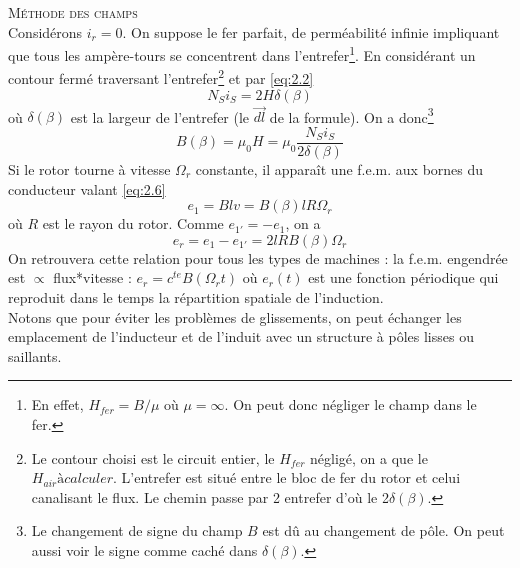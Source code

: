 		\textsc{Méthode des champs}\\
		Considérons $i_r=0$. On suppose le fer parfait, de perméabilité 
		infinie impliquant que tous les ampère-tours se concentrent dans 
		l'entrefer\footnote{En effet, $H_{fer} = B/\mu$ où $\mu = \infty$. 
		On peut donc négliger le champ dans le fer.}. En considérant un 
		contour fermé traversant l'entrefer\footnote{Le contour choisi est le circuit entier, le $H_{fer}$ négligé, on a que le $H_{air} à calculer$. L'entrefer est situé entre le bloc de fer du rotor et celui canalisant le flux. Le chemin passe par 2 entrefer d'où le 2$\delta (\beta)$.} et par \autoref{eq:2.2}
		\begin{equation}
		N_Si_S = 2H\delta(\beta)
		\end{equation}
		où $\delta(\beta)$ est la largeur de l'entrefer (le $\vec{dl}$ de la formule). On a donc\footnote{Le changement de signe du champ $B$ est dû au changement de pôle. On peut aussi voir le signe comme caché dans $\delta (\beta)$.}
		\begin{equation}
		B(\beta) = \mu_0H = \mu_0\frac{N_Si_S}{2\delta(\beta)}
		\end{equation}
		Si le rotor tourne à vitesse $\Omega_r$ constante, il apparaît une 
		f.e.m. aux bornes du conducteur valant \autoref{eq:2.6}
		\begin{equation}
		e_1 = Blv = B(\beta)lR\Omega_r
		\label{eq:2.10}
		\end{equation}
		où $R$ est le rayon du rotor. Comme $e_{1'} = -e_1$, on a 
		\begin{equation}
		e_r = e_1-e_{1'} = 2lRB(\beta)\Omega_r
		\end{equation}
		On retrouvera cette relation pour tous les types de machines : la 
		f.e.m. engendrée est $\propto$ flux*vitesse : $e_r = c^{te}B(
		\Omega_rt)$ où $e_r(t)$ est une fonction périodique qui reproduit 
		dans le temps la répartition spatiale de l'induction. \\
		Notons que pour éviter les problèmes de glissements, on peut 
		échanger les emplacement de l'inducteur et de l'induit avec un 
		structure à pôles lisses ou saillants.\\
		
